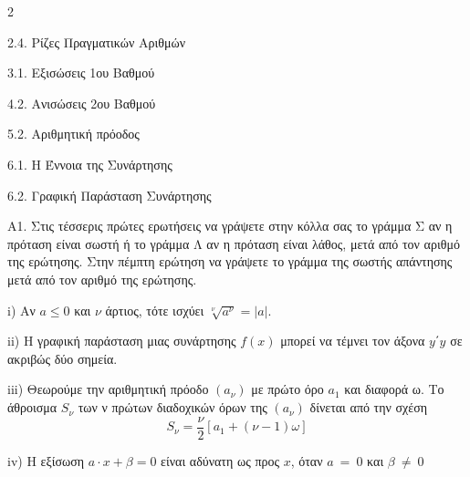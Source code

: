 \begin{ylh}{2}
    \item 2.4. Ρίζες Πραγματικών Αριθμών
    \item 3.1. Εξισώσεις 1ου Βαθμού
    \item 4.2. Ανισώσεις 2ου Βαθμού
    \item 5.2. Αριθμητική πρόοδος
    \item 6.1. Η Έννοια της Συνάρτησης
    \item 6.2. Γραφική Παράσταση Συνάρτησης
\end{ylh}
Α1. Στις τέσσερις πρώτες ερωτήσεις να γράψετε στην κόλλα σας το γράμμα Σ αν η πρόταση είναι σωστή ή το γράμμα Λ αν η πρόταση είναι λάθος, μετά από τον αριθμό της ερώτησης. Στην πέμπτη ερώτηση να γράψετε το γράμμα της σωστής απάντησης μετά από τον αριθμό της ερώτησης.

i) Αν $a \leq 0$ και $\nu$ άρτιος, τότε ισχύει $\sqrt[\nu]{a^{\nu}} = |a|$.

ii) Η γραφική παράσταση μιας συνάρτησης $f(x)$ μπορεί να τέμνει τον άξονα $y΄y$ σε ακριβώς δύο σημεία.

iii) Θεωρούμε την αριθμητική πρόοδο $\left( a_{\nu} \right)$ με πρώτο όρο $a_{1}$ και διαφορά ω. Το άθροισμα $S_{\nu}$ των ν πρώτων διαδοχικών όρων της $\left( a_{\nu} \right)$ δίνεται από την σχέση \[S_{\nu} = \dfrac{\nu}{2}\left\lbrack a_{1} + (\nu - 1)\omega \right\rbrack\]

iv) Η εξίσωση $a \cdot x + \beta = 0$ είναι αδύνατη ως προς $x$, όταν $a\  = \ 0$ και $\beta\  \neq \ 0$

